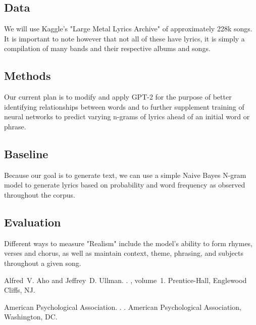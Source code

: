 \documentclass[11pt]{article}
\begin{document}
\subsection{Data} %
We will use Kaggle's "Large Metal Lyrics Archive" of approximately 228k songs. It is important to note however that not all of these have lyrics, it is simply a compilation of many bands and their respective albums and songs.
\subsection{Methods} %
Our current plan is to modify and apply GPT-2 for the purpose of better identifying relationships between words and to further supplement training of neural networks to predict varying n-grams of lyrics ahead of an initial word or phrase.
\subsection{Baseline} %
Because our goal is to generate text, we can use a simple Naive Bayes N-gram model to generate lyrics based on probability and word frequency as observed throughout the corpus.
\subsection{Evaluation} %
Different ways to measure "Realism" include the model's ability to form rhymes, verses and chorus, as well as maintain context, theme, phrasing, and subjects throughout a given song.


%
%

\begin{thebibliography}{}

Alfred~V. Aho and Jeffrey~D. Ullman.
.
, volume~1.
\newblock Prentice-{Hall}, Englewood Cliffs, NJ.

{American Psychological Association}.
.
.
\newblock American Psychological Association, Washington, DC.



\end{thebibliography}
\end{document}
